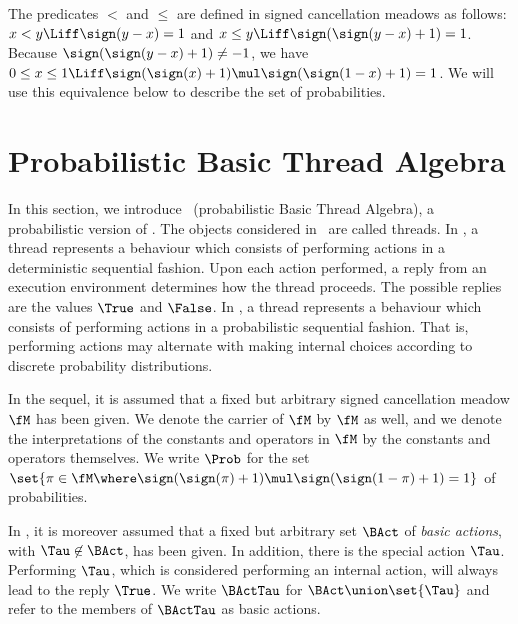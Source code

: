 \documentclass{llncs}
\begin{document}
The predicates $<$ and $\leq$ are defined in signed cancellation meadows 
as follows: 
$x < y \Liff \sign(y - x) = 1$ and
$x \leq y \Liff \sign(\sign(y - x) + 1) = 1$.
Because $\sign(\sign(y - x) + 1) \neq -1$, we have
$0 \leq x \leq 1 \Liff 
 \sign(\sign(x) + 1) \mul \sign(\sign(1 - x) + 1) = 1$.
We will use this equivalence below to describe the set of probabilities.

\section{Probabilistic Basic Thread Algebra}
\label{sect-prBTA}

In this section, we introduce \prBTA\ 
(probabilistic Basic Thread Algebra), a probabilistic version of \BTA.
The objects considered in \BTA\ are called threads.
In \BTA, a thread represents a behaviour which consists of performing 
actions in a deterministic sequential fashion.
Upon each action performed, a reply from an execution environment 
determines how the thread proceeds.
The possible replies are the values $\True$ and $\False$.
In \prBTA, a thread represents a behaviour which consists of performing 
actions in a probabilistic sequential fashion.
That is, performing actions may alternate with making internal choices 
according to discrete probability distributions.

In the sequel, it is assumed that a fixed but arbitrary signed 
cancellation meadow $\fM$ has been given.
We denote the carrier of $\fM$ by $\fM$ as well, and we denote the 
interpretations of the constants and operators in $\fM$ by the constants 
and operators themselves.
We write $\Prob$ for the set
$\set{\pi \in \fM \where
 \sign(\sign(\pi) + 1) \mul \sign(\sign(1 - \pi) + 1) = 1}$ 
of probabilities.

In \prBTA, it is moreover assumed that a fixed but arbitrary set $\BAct$ 
of \emph{basic actions}, with $\Tau \not\in \BAct$, has been given.
In addition, there is the special action $\Tau$.
Performing $\Tau$, which is considered performing an internal action,
will always lead to the reply $\True$.
We write $\BActTau$ for $\BAct \union \set{\Tau}$ and refer to the 
members of $\BActTau$ as basic actions.
\end{document}
